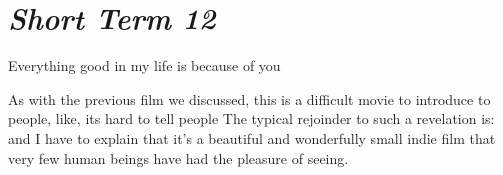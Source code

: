 \documentclass[../butidigress.tex]{subfiles}
\begin{document}
\section{\textit{Short Term 12}}
\epigraph{Everything good in my life is because of you}{}

As with the previous film we discussed, this is a difficult movie to introduce to people, like, its hard to tell people 
The typical rejoinder to such a revelation is:  and I have to explain that it's a beautiful and wonderfully small indie film that very few human beings have had the pleasure of seeing.
\end{document}
